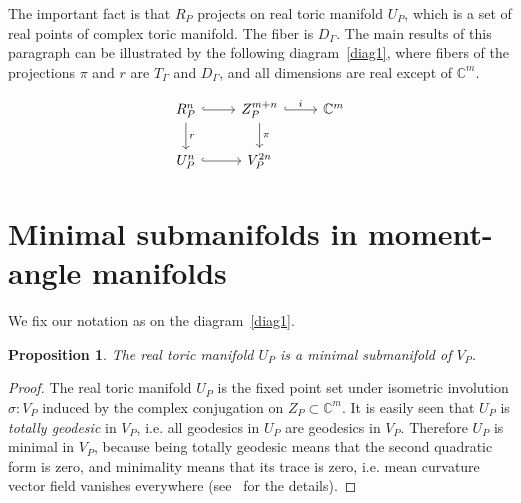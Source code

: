 \documentclass[jsg]{IP_v1_forauthors}
\newtheorem{prop}[theo]{Proposition}
\theoremstyle{definition}
\numberwithin{equation}{section}
\begin{document}
The important fact is that $R_P$ projects on real toric manifold $U_P$, which is a set of real points of complex toric manifold. The fiber is $D_\Gamma$. The main results of this paragraph can be illustrated by the following diagram~\eqref{diag1}, where fibers of the projections $\pi$ and $r$ are $T_\Gamma$ and $D_\Gamma$, and all dimensions are real except of ${\mathbb C}^{m}$.

\begin{equation}\label{diag1}
\begin{tikzcd}
R_P^n \arrow[hookrightarrow]{r} \arrow[rightarrow]{d}{r}
  & Z_P^{m+n} \arrow[hookrightarrow]{r}{i}\arrow[rightarrow]{d}{\pi}
  & {\mathbb C}^{m} \\
U_P^n \arrow[hookrightarrow]{r}
  & V_P^{2n}
\end{tikzcd}
\end{equation}


\section{Minimal submanifolds in moment-angle manifolds}

We fix our notation as on the diagram~\eqref{diag1}.

\begin{prop}\label{prop1}
The real toric manifold $U_P$ is a minimal submanifold of $V_P$.
\end{prop}
\begin{proof}
The real toric manifold $U_P$ is the fixed point set under isometric involution $\sigma \colon V_P$ induced by the complex conjugation on $Z_P \subset {\mathbb C}^m$. It is easily seen that $U_P$ is {\itshape totally geodesic} in $V_P$, i.e. all geodesics in  $U_P$ are geodesics in $V_P$. Therefore $U_P$ is minimal in $V_P$, because being totally geodesic means that the second quadratic form is zero, and minimality means that its trace is zero, i.e. mean curvature vector field vanishes everywhere (see~\cite[Chapter 1]{L} for the details).
\end{proof}
\end{document}
